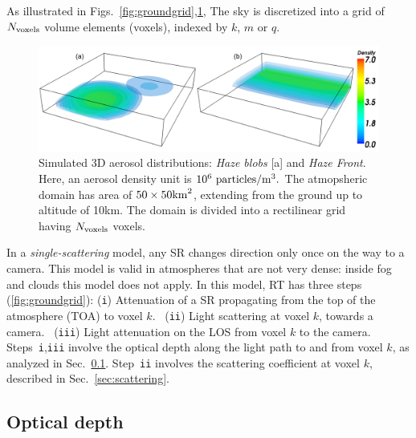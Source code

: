 \documentclass[10pt,letterpaper]{article}
\newcommand{\yoavcomment}[1]{}
\renewcommand{\yoavcomment}[1]{#1} %
\begin{document}
As illustrated in Figs.~\ref{fig:groundgrid},\ref{fig:distributions},
The sky is discretized into a grid of $N_{\rm voxels}$ volume elements
(voxels), indexed by $k$, $m$ or $q$.
\begin{figure}
  \centering
  \yoavcomment{\includegraphics[width=\columnwidth]{images/distributions}}
  \caption{\small Simulated 3D aerosol distributions: {\em Haze blobs}
    [a] and {\em Haze Front}.  Here, an aerosol density unit is
    $10^{6}~{\rm particles}/{\rm m}^3.$ The atmopsheric domain has
    area of $50\times 50{\rm km}^2$, extending from the ground up to
    altitude of 10km. The domain is divided into a rectilinear grid
    having $N_{\rm voxels}$ voxels.}
  \label{fig:distributions}
\end{figure}
In a \emph{single-scattering} model, any SR changes direction only
once on the way to a camera. This model is valid in atmospheres that
are not very dense: inside fog and clouds this model does not
apply. In this model, RT has three steps (\cref{fig:groundgrid}):
({\tt i}) Attenuation of a SR propagating from the top of the
atmosphere (TOA) to voxel $k$. ~({\tt ii}) Light scattering at voxel
$k$, towards a camera. ~({\tt iii}) Light attenuation on the LOS from
voxel $k$ to the camera.~~ Steps~{\tt i},{\tt iii} involve the optical
depth along the light path to and from voxel $k$, as analyzed in
Sec.~\ref{sec:optical-depth}.  Step~{\tt ii} involves the scattering
coefficient at voxel $k$, described in Sec.~\ref{sec:scattering}.


\subsection{Optical depth}
\label{sec:optical-depth}
\end{document}
